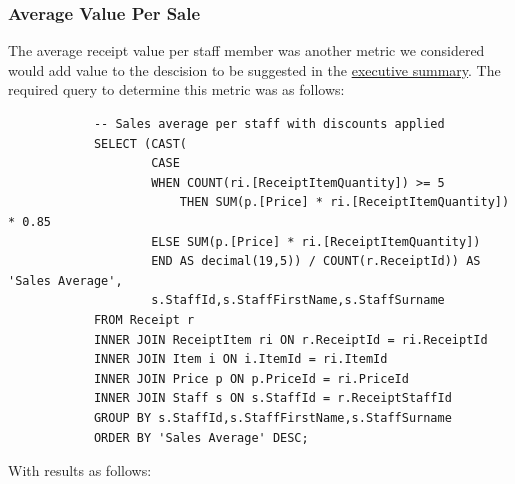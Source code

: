 \documentclass{article}
\begin{document}
            \newpage

            \subsubsection{Average Value Per Sale}

            The average receipt value per staff member was another metric we considered would add
            value to the descision to be suggested in the 
            \hyperref[sec:Executive Summary]{\color{blue}executive summary}.
            The required query to determine this metric was as follows:

            \begin{lstlisting}
            -- Sales average per staff with discounts applied
            SELECT (CAST(
                    CASE
                    WHEN COUNT(ri.[ReceiptItemQuantity]) >= 5
                        THEN SUM(p.[Price] * ri.[ReceiptItemQuantity]) * 0.85
                    ELSE SUM(p.[Price] * ri.[ReceiptItemQuantity])
                    END AS decimal(19,5)) / COUNT(r.ReceiptId)) AS 'Sales Average',
                    s.StaffId,s.StaffFirstName,s.StaffSurname
            FROM Receipt r
            INNER JOIN ReceiptItem ri ON r.ReceiptId = ri.ReceiptId
            INNER JOIN Item i ON i.ItemId = ri.ItemId
            INNER JOIN Price p ON p.PriceId = ri.PriceId
            INNER JOIN Staff s ON s.StaffId = r.ReceiptStaffId
            GROUP BY s.StaffId,s.StaffFirstName,s.StaffSurname
            ORDER BY 'Sales Average' DESC;
            \end{lstlisting}

            With results as follows:
\end{document}
